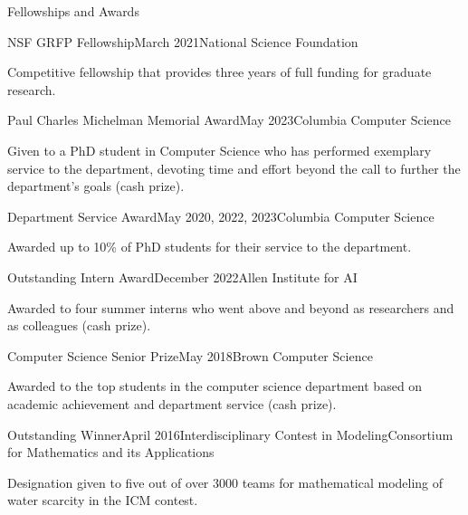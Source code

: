 \documentclass{cv} %
\begin{document}

\begin{rSection}{Fellowships and Awards} \itemsep -2pt

\begin{rSubsection}{NSF GRFP Fellowship}{March 2021}{National Science Foundation}{}
\item Competitive fellowship that provides three years of full funding for graduate research.
\end{rSubsection}

\begin{rSubsection}{Paul Charles Michelman Memorial Award}{May 2023}{Columbia Computer Science}{}
\item Given to a PhD student in Computer Science who has performed exemplary service to the department, devoting time and effort beyond the call to further the department’s goals (cash prize).
\end{rSubsection}

\begin{rSubsection}{Department Service Award}{May 2020, 2022, 2023}{Columbia Computer Science}{}
\item Awarded up to 10\% of PhD students for their service to the department.
\end{rSubsection}

\begin{rSubsection}{Outstanding Intern Award}{December 2022}{Allen Institute for AI}{}
\item Awarded to four summer interns who went above and beyond as researchers and as colleagues (cash prize).
\end{rSubsection}

\begin{rSubsection}{Computer Science Senior Prize}{May 2018}{Brown Computer Science}{}
\item Awarded to the top students in the computer science department based on academic achievement and department service (cash prize).
\end{rSubsection}

\begin{rSubsection}{Outstanding Winner}{April 2016}{Interdisciplinary Contest in Modeling}{Consortium for Mathematics and its Applications}
\item Designation given to five out of over 3000 teams for mathematical modeling of water scarcity in the ICM contest.
\end{rSubsection}

\end{rSection}
\end{document}

